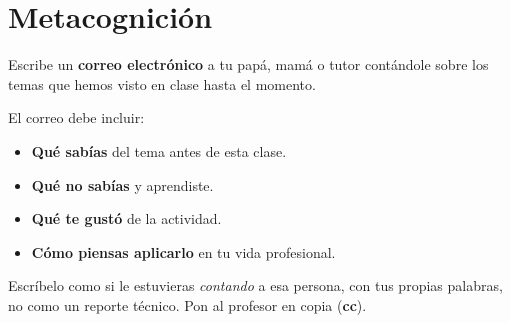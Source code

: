 \documentclass[12pt, oneside]{article}
\begin{document}
\section{Metacognición}

Escribe un \textbf{correo electrónico} a tu papá, mamá o tutor contándole
sobre los temas que hemos visto en clase hasta el momento.

El correo debe incluir:

\begin{itemize}
  \item \textbf{Qué sabías} del tema antes de esta clase.
  \item \textbf{Qué no sabías} y aprendiste.
  \item \textbf{Qué te gustó} de la actividad.
  \item \textbf{Cómo piensas aplicarlo} en tu vida profesional.
\end{itemize}

Escríbelo como si le estuvieras \textit{contando} a esa persona, con tus
propias palabras, no como un reporte técnico.  Pon al profesor en copia
(\textbf{cc}).
\end{document}
